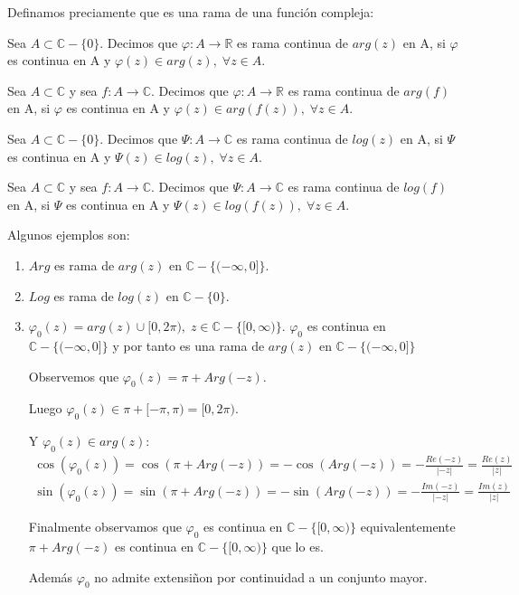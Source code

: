Definamos preciamente que es una rama de una función compleja:

\begin{definicion}
  Sea \(A \subset \mathbb{C}-\{0\}\).
  Decimos que \(\varphi: A \to \mathbb{R}\) es rama continua de \(arg(z)\) en A, si \(\varphi\) es continua en A y \(\varphi(z) \in arg(z), \; \forall z \in A\).
\end{definicion}

\begin{definicion}
  Sea \(A \subset \mathbb{C}\) y sea \(f:A\to \mathbb{C}\).
  Decimos que \(\varphi: A \to \mathbb{R}\) es rama continua de \(arg(f)\) en A, si \(\varphi\) es continua en A y \(\varphi(z) \in arg(f(z)), \; \forall z \in A\).
\end{definicion}

\begin{definicion}
  Sea \(A \subset \mathbb{C}-\{0\}\).
  Decimos que \(\Psi: A \to \mathbb{C}\) es rama continua de \(log(z)\) en A, si \(\Psi\) es continua en A y \(\Psi(z) \in log(z), \; \forall z \in A\).
\end{definicion}

\begin{definicion}
  Sea \(A \subset \mathbb{C}\) y sea \(f: A\to \mathbb{C}\).
  Decimos que \(\Psi: A \to \mathbb{C}\) es rama continua de \(log(f)\) en A, si \(\Psi\) es continua en A y \(\Psi(z) \in log(f(z)), \; \forall z \in A\).
\end{definicion}

Algunos ejemplos son:

\begin{enumerate}
  \item \(Arg\) es rama de \(arg(z)\) en \(\mathbb{C}-\{(-\infty,0]\}\).
  \item \(Log\) es rama de \(log(z)\) en \(\mathbb{C}-\{0\}\).
  \item \(\varphi_0(z)=arg(z) \cup [0,2\pi), \; z \in \mathbb{C}-\{[0,\infty)\}\).
    \(\varphi_0\) es continua en \(\mathbb{C}-\{(-\infty,0]\}\) y por tanto es una rama de \(arg(z)\) en \(\mathbb{C}-\{(-\infty,0]\}\)

    Observemos que \(\varphi_0(z) = \pi + Arg(-z)\).

    Luego \(\varphi_0(z) \in \pi + [-\pi,\pi) = [0,2\pi)\).

    Y \(\varphi_0(z) \in arg(z)\):
    \begin{eqnarray*}
      \cos(\varphi_0(z)) = \cos(\pi+Arg(-z)) = -\cos(Arg(-z)) = - \frac{Re(-z)}{|-z|} = \frac{Re(z)}{|z|} \\
      \sin(\varphi_0(z)) = \sin(\pi+Arg(-z)) = -\sin(Arg(-z)) = - \frac{Im(-z)}{|-z|} = \frac{Im(z)}{|z|}
    \end{eqnarray*}

    Finalmente observamos que \(\varphi_0\) es continua en \(\mathbb{C}-\{[0,\infty)\}\) equivalentemente \(\pi + Arg(-z)\) es continua en \(\mathbb{C}-\{[0,\infty)\}\) que lo es.

    Además \(\varphi_0\) no admite extensiñon por continuidad a un conjunto mayor.
\end{enumerate}
